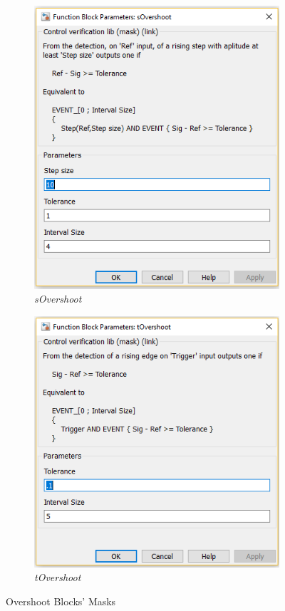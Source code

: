 \begin{figure}[ht]
\centering
\begin{subfigure}[b]{.4\textwidth}
\centering
\includegraphics[width=\textwidth]{Figs/sovmask.PNG}
\caption{\textit{sOvershoot}}
\label{fig:sovmask}
\end{subfigure}
\begin{subfigure}[b]{.4\textwidth}
\centering
\includegraphics[width=\textwidth]{Figs/tovmask.PNG}
\caption{\textit{tOvershoot}}
\label{fig:tovmask}
\end{subfigure}
\caption{Overshoot Blocks' Masks}
\end{figure}
